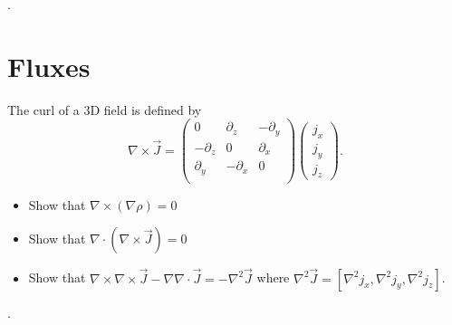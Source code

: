 \documentclass{article} %
\begin{document}
\newpage

.

\newpage

\section{Fluxes}

The curl of a 3D field is defined by
$$ \nabla \times {\vec J} = \begin{pmatrix}
0 & \partial_z & - \partial_y \\
-\partial_z &  0 & \partial_x \\
\partial_y &  - \partial_x & 0 \\
\end{pmatrix} \begin{pmatrix} j_x \\ j_y \\ j_z \end{pmatrix}. $$

\begin{itemize}
\item Show that $ \nabla \times  (\nabla \rho) = 0$
\item Show that $\nabla \cdot (\nabla \times  \vec J) = 0$
\item Show that $\nabla \times\nabla \times \vec J - \nabla \nabla \cdot \vec J = - \nabla^2 \vec J$
where  $\nabla^2 \vec J = [ \nabla^2 j_x ,  \nabla^2 j_y,  \nabla^2 j_z]$.
\end{itemize} 

 \newpage

. 
\end{document}
